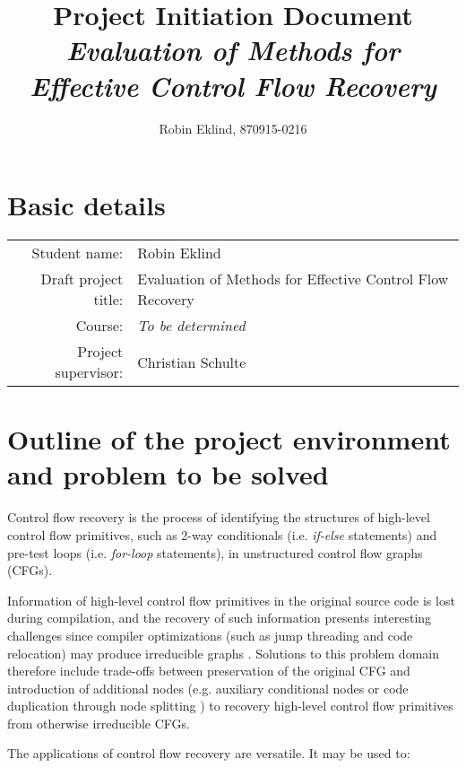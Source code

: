 \documentclass[12pt, a4paper]{article}
\title{Project Initiation Document\\ \textit{\large{Evaluation of Methods for Effective Control Flow Recovery}}}
\author{Robin Eklind, 870915-0216}
\begin{document}
\maketitle

\section{Basic details}

\begin{table}[htbp]
	\begin{center}
		\begin{tabular}{r|l|}
			\cline{2-2}
			Student name: & Robin Eklind \\
			\cline{2-2}
			Draft project title: & Evaluation of Methods for Effective Control Flow Recovery \\
			\cline{2-2}
			Course: & \textit{To be determined} \\
			\cline{2-2}
			Project supervisor: & Christian Schulte \\
			\cline{2-2}
		\end{tabular}
	\end{center}
\end{table}

\section{Outline of the project environment and problem to be solved}

Control flow recovery is the process of identifying the structures of high-level control flow primitives, such as 2-way conditionals (i.e. \textit{if-else} statements) and pre-test loops (i.e. \textit{for-loop} statements), in unstructured control flow graphs (CFGs).

Information of high-level control flow primitives in the original source code is lost during compilation, and the recovery of such information presents interesting challenges since compiler optimizations (such as jump threading and code relocation) may produce irreducible graphs \cite{cifuentes_reverse_comp}. Solutions to this problem domain therefore include trade-offs between preservation of the original CFG and introduction of additional nodes (e.g. auxiliary conditional nodes \cite{no_more_gotos} or code duplication through node splitting \cite{node_splitting}) to recovery high-level control flow primitives from otherwise irreducible CFGs.

The applications of control flow recovery are versatile. It may be used to:
\end{document}
